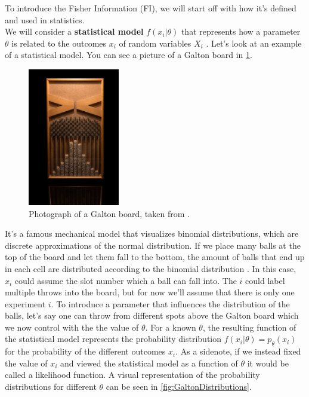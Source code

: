 To introduce the Fisher Information (FI), we will start off with how it's defined and used in statistics.\\
We will consider a \textbf{statistical model} $f(x_i|\theta)$ that represents how a parameter $\theta$ is related to the outcomes $x_i$ of random variables $X_i$ \cite{StatisticFisherInfoTutorial}. Let's look at an example of a statistical model. You can see a picture of a Galton board in \cref{fig:GaltonPicture}.
\begin{figure}
	\centering
	\includegraphics[width = 4cm]{text/FisherInformation/plots/GaltonBoard.jpg}
	\caption{Photograph of a Galton board, taken from \cite{GaltonBoardPicture}.}
	\label{fig:GaltonPicture}
\end{figure}
It's a famous mechanical model that visualizes binomial distributions, which are discrete approximations of the normal distribution. If we place many balls at the top of the board and let them fall to the bottom, the amount of balls that end up in each cell are distributed according to the binomial distribution \cite{GaltonBoardArticle}. In this case, $x_i$ could assume the slot number which a ball can fall into. The $i$ could label multiple throws into the board, but for now we'll assume that there is only one experiment $i$. To introduce a parameter that influences the distribution of the balls, let's say one can throw from different spots above the Galton board which we now control with the the value of $\theta$. For a known $\theta$, the resulting function of the statistical model represents the probability distribution $f(x_i|\theta) = p_\theta(x_i)$ for the probability of the different outcomes $x_i$. As a sidenote, if we instead fixed the value of $x_i$ and viewed the statistical model as a function of $\theta$ it would be called a likelihood function. A visual representation of the probability distributions for different $\theta$ can be seen in \cref{fig:GaltonDistributions}.
